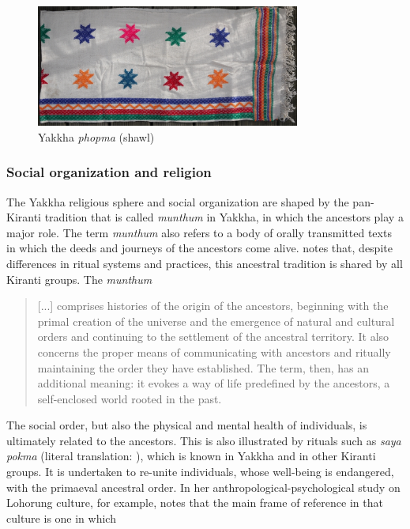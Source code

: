 \begin{figure}[h]
\centering
\includegraphics[height=4cm]{figures/phopma.jpg}
\caption{Yakkha \emph{phopma} (shawl)}\label{phopma}
\end{figure}

\subsubsection{Social organization and religion}\label{social}

The Yakkha religious sphere and social organization are shaped by the pan-Kiranti tradition that is called \emph{munthum} in Yakkha, in which the ancestors play a major role. The term \emph{munthum} also refers to a body of orally transmitted texts in which the deeds and journeys of the ancestors come alive. \citet{Gaenszle_Redefining} notes that, despite differences in ritual systems and practices, this ancestral tradition is shared by  all Kiranti groups. The \emph{munthum}

\begin{quote}
[...] comprises histories of the origin of the ancestors, beginning with the primal creation of the universe and the emergence of natural and cultural orders and continuing to the settlement of the ancestral territory. It also concerns the proper means of communicating with ancestors and ritually maintaining the order they have established. The term, then, has an additional meaning: it evokes a way of life predefined by the ancestors, a self-enclosed world rooted in the past. \citep[224]{Gaenszle2000Origins}
\end{quote}

The social order, but also the physical and mental health of individuals, is ultimately related to the ancestors. This is also illustrated by rituals such as \emph{saya pokma} (literal translation: ), which is known in Yakkha and in other Kiranti groups. It is undertaken to re-unite individuals, whose well-being is endangered, with the primaeval ancestral order. In her anthropological-psychological study on Lohorung culture, for example, \citet{Hardman2000_Other} notes that the main frame of reference in that culture is one in which

